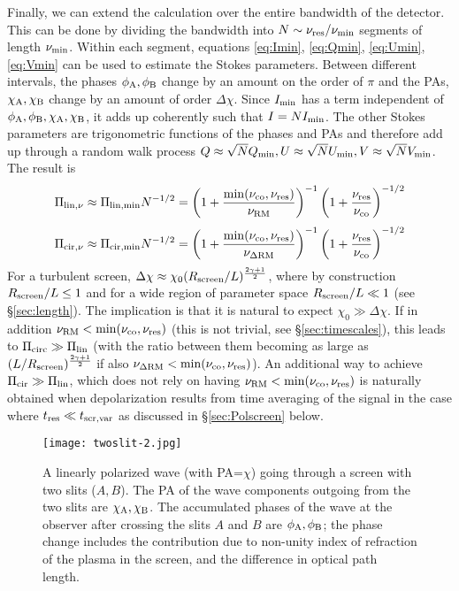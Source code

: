 \documentclass[fleqn,usenatbib]{mnras}
\begin{document}
	Finally, we can extend the calculation over the entire bandwidth of the detector. This can be done by dividing the bandwidth into $N\sim \nu_{\rm res}/\nu_{\rm min}$ segments of length $\nu_{\rm min}$. Within each segment, equations \ref{eq:Imin}, \ref{eq:Qmin}, \ref{eq:Umin}, \ref{eq:Vmin} can be used to estimate the Stokes parameters. Between different intervals, the phases $\phi_{\rm A}, \phi_{\rm B}$ change by an amount on the order of $\pi$ and the PAs, $\chi_{\rm A}, \chi_{\rm B}$ change by an amount of order $\Delta \chi$. Since $I_{\rm min}$ has a term independent of $\phi_{\rm A}, \phi_{\rm B}, \chi_{\rm A}, \chi_{\rm B}$, it adds up coherently such that $I=NI_{\rm min}$. The other Stokes parameters are trigonometric functions of the phases and PAs and therefore add up through a random walk process $Q\approx \sqrt{N}Q_{\rm min}, U\approx \sqrt{N}U_{\rm min}, V\approx \sqrt{N}V_{\rm min}$. The result is
	\begin{equation}
		\label{eq:Pilintoy}
		\Pi_{\rm lin,\nu}\approx \Pi_{\rm lin,min}N^{-1/2}=\left(1+\frac{\min(\nu_{\rm co},\nu_{\rm res})}{\nu_{\rm RM}}\right)^{-1} \left(1+\frac{\nu_{\rm res}}{\nu_{\rm co}}\right)^{-1/2}
	\end{equation}
	\begin{equation}
		\label{eq:Picirtoy}
		\Pi_{\rm cir,\nu}\approx \Pi_{\rm cir,min}N^{-1/2}=\left(1+\frac{\min(\nu_{\rm co},\nu_{\rm res})}{\nu_{\rm \Delta RM}}\right)^{-1} \left(1+\frac{\nu_{\rm res}}{\nu_{\rm co}}\right)^{-1/2}
	\end{equation}
	For a turbulent screen, $\Delta \chi\approx \chi_0 (R_{\rm screen}/L)^{2\gamma+1\over 2}$, where by construction $R_{\rm screen}/L\leq 1$ and for a wide region of parameter space $R_{\rm screen}/L\ll 1$ (see \S \ref{sec:length}). The implication is that it is natural to expect $\chi_0\gg \Delta \chi$. If in addition $\nu_{\rm RM}<\min(\nu_{\rm co},\nu_{\rm res})$ (this is not trivial, see \S \ref{sec:timescales}), this leads to $\Pi_{\rm circ}\gg \Pi_{\rm lin}$ (with the ratio between them becoming as large as $(L/R_{\rm screen})^{2\gamma+1\over 2}$ if also $\nu_{\rm \Delta RM}<\min(\nu_{\rm co},\nu_{\rm res})$).
	An additional way to achieve $\Pi_{\rm cir}\gg \Pi_{\rm lin}$, which does not rely on having $\nu_{\rm RM}<\min(\nu_{\rm co},\nu_{\rm res})$ is naturally obtained when depolarization results from time averaging of the signal in the case where $t_{\rm res}\ll t_{\rm scr,var}$ as discussed in \S \ref{sec:Polscreen} below.
	\begin{figure}
		\centering
		\texttt{[image: twoslit-2.jpg]}
		\caption{A linearly polarized wave (with PA=$\chi$) going through a screen with two slits ($A,B$). The PA of the wave components outgoing from the two slits are $\chi_{\rm A},\chi_{\rm B}$. The accumulated phases of the wave at the observer after crossing the slits $A$ and $B$ are $\phi_{\rm A},\phi_{\rm B}$; the phase change includes the contribution due to non-unity index of refraction of the plasma in the screen, and the difference in optical path length.}
		\label{fig:twoslit}
	\end{figure}
	
\end{document}
